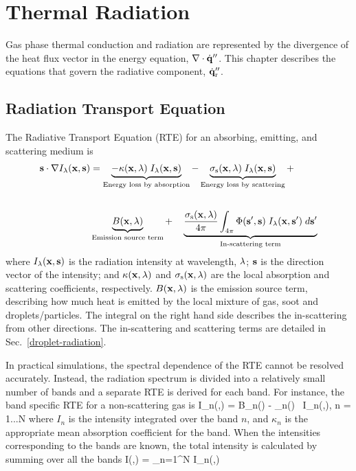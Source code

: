 

\chapter{Thermal Radiation}
\label{chapter:radiation}

Gas phase thermal conduction and radiation are represented by the divergence of the heat flux vector in the energy equation, $\nabla \cdot \dot{\mathbf{q}}''$. This chapter describes the equations that govern the radiative component, $\dot{\mathbf{q}}''_{\rm r}$.


\section{Radiation Transport Equation}
\label{RTEsection}

The Radiative Transport Equation (RTE) for an absorbing, emitting, and scattering medium is \cite{Viskanta:1987}
\begin{align}
{\mathbf{s}} \cdot \nabla I_{\lambda}({\mathbf{x}},{\mathbf{s}}) &=
\underbrace{ - \kappa({\mathbf{x}},\lambda)   \; I_\lambda({\mathbf{x}},{\mathbf{s}}) }_{\textrm{Energy loss by absorption}} -
\underbrace{\sigma_{\rm s}({\mathbf{x}},\lambda) \; I_\lambda({\mathbf{x}},{\mathbf{s}}) }_{\textrm{Energy loss by scattering}} +  \notag \\[0.25in]
& \underbrace{   B({\mathbf{x}},\lambda) }_{\textrm{Emission source term}} + \quad
\underbrace{   \frac{\sigma_{\rm s}({\mathbf{x}},\lambda)}{4\pi}
\int_{4\pi}\Phi({\mathbf{s}}',{\mathbf{s}}) \; I_{\lambda}({\mathbf{x}},{\mathbf{s}}') \; d{\mathbf{s}}'
 }_{\textrm{In-scattering term}}
\label{RTEbasic}
\end{align}
where $I_{\lambda}({\mathbf{x}},{\mathbf{s}})$ is the radiation intensity at wavelength, $\lambda$; ${\mathbf{s}}$ is the direction vector of the intensity; and $\kappa({\mathbf{x}},\lambda)$ and $\sigma_{\rm s}({\mathbf{x}},\lambda)$ are the local absorption and scattering coefficients, respectively. $B({\mathbf{x}},\lambda)$ is the emission source term, describing how much heat is emitted by the local mixture of gas, soot and droplets/particles. The integral on the right hand side describes the in-scattering from other directions. The in-scattering and scattering terms are detailed in Sec.~\ref{droplet-radiation}.

In practical simulations, the spectral dependence of the RTE cannot be resolved accurately. Instead, the radiation spectrum is divided into a relatively small number of bands and a separate RTE is derived for each band. For instance, the band specific RTE for a non-scattering gas is
\be
   \bs \cdot \nabla I_n(\bx,\bs) = B_n(\bx) - \kappa_n(\bx) \, I_n(\bx,\bs),\;\; n = 1...N  \label{bandRTE}
\ee
where $I_n$ is the intensity integrated over the band $n$, and $\kappa_n$ is the appropriate mean absorption coefficient for the band. When the intensities corresponding to the bands are known, the total intensity is calculated by summing over all the bands
\be
   I(\bx,\bs) = \sum_{n=1}^N I_n(\bx,\bs)
\ee

